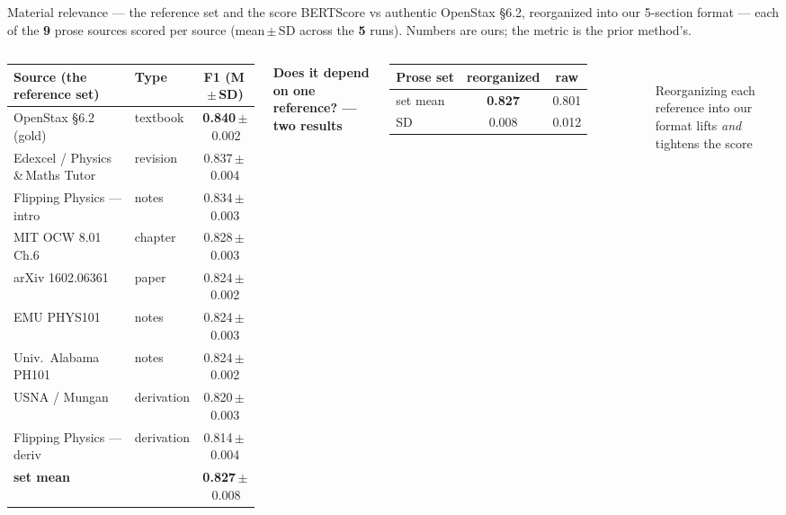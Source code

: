 \documentclass[aspectratio=169,10pt]{beamer}
\newcommand{\hl}[1]{{\bfseries\color{cAccent}#1}}
\begin{document}
\begin{frame}{Material relevance --- the reference set and the score}
\scriptsize
BERTScore vs authentic OpenStax \S6.2, reorganized into our 5-section format --- each of the \hl{9}
prose sources scored per source (mean\,$\pm$\,SD across the \hl{5} runs). Numbers are ours; the metric
is the prior method's.
\vspace{0.2em}
\begin{columns}[T]
{\tiny
\begin{tabular}{llc}
\toprule
\textbf{Source (the reference set)} & \textbf{Type} & \textbf{F1 (M\,$\pm$\,SD)} \\
\midrule
OpenStax \S6.2 (gold)              & textbook    & \hl{0.840}\,$\pm$\,0.002 \\
Edexcel / Physics\,\&\,Maths Tutor & revision    & 0.837\,$\pm$\,0.004 \\
Flipping Physics --- intro         & notes       & 0.834\,$\pm$\,0.003 \\
MIT OCW 8.01 Ch.6                  & chapter     & 0.828\,$\pm$\,0.003 \\
arXiv 1602.06361                  & paper       & 0.824\,$\pm$\,0.002 \\
EMU PHYS101                       & notes       & 0.824\,$\pm$\,0.003 \\
Univ.\ Alabama PH101               & notes       & 0.824\,$\pm$\,0.002 \\
USNA / Mungan                     & derivation  & 0.820\,$\pm$\,0.003 \\
Flipping Physics --- deriv         & derivation  & 0.814\,$\pm$\,0.004 \\
\midrule
\textbf{set mean}                 &             & \hl{0.827}\,$\pm$\,0.008 \\
\bottomrule
\end{tabular}}
{\footnotesize\textbf{Does it depend on one reference? --- two results}}\\[2pt]
{\footnotesize
\begin{tabular}{lcc}
\toprule
\textbf{Prose set} & \textbf{reorganized} & \textbf{raw} \\
\midrule
set mean & \hl{0.827} & 0.801 \\
SD       & 0.008      & 0.012 \\
\bottomrule
\end{tabular}}\\[3pt]
{\scriptsize Reorganizing each reference into our format lifts \emph{and} tightens the score
}
\end{columns}
\end{frame}
\end{document}
